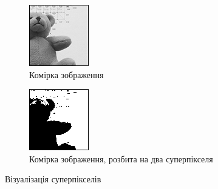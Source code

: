 \begin{figure}[h]
\centering
    \begin{subfigure}[t]{0.3\textwidth}
        \centering
        \includegraphics[width=\textwidth]{images/cell}
        \caption{Комірка зображення}
        \label{fig:cell}
    \end{subfigure}
    \qquad
    \begin{subfigure}[t]{0.3\textwidth}
        \centering
        \includegraphics[width=\textwidth]{images/superpixels}
        \caption{Комірка зображення, розбита на два суперпікселя}
        \label{fig:superpixels}
    \end{subfigure}
    \caption{Візуалізація суперпікселів}
    \label{fig:superpixels:visualization}
\end{figure}

